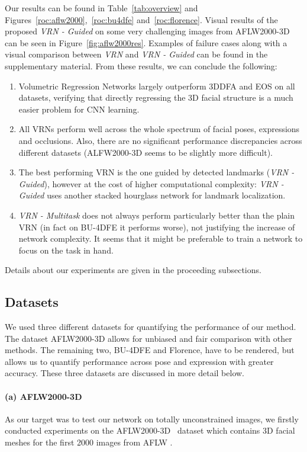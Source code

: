 Our results can be found in Table~\ref{tab:overview} and
Figures~\ref{roc:aflw2000},~\ref{roc:bu4dfe} and~\ref{roc:florence}.
Visual results of the proposed \textit{VRN - Guided} on some very
challenging images from AFLW2000-3D can be seen in
Figure~\ref{fig:aflw2000res}. Examples of failure cases along with a
visual comparison between \textit{VRN} and \textit{VRN - Guided} can
be found in the supplementary material. From these results, we can
conclude the following:
\begin{enumerate}
\item Volumetric Regression Networks largely outperform 3DDFA and EOS
  on all datasets, verifying that directly regressing the 3D facial
  structure is a much easier problem for CNN learning.
\item All VRNs perform well across the whole spectrum of facial poses,
  expressions and occlusions. Also, there are no significant performance
  discrepancies across different datasets (ALFW2000-3D seems to be
  slightly more difficult).
\item The best performing VRN is the one guided by detected landmarks
  (\textit{VRN - Guided}), however at the cost of higher computational
  complexity: \textit{VRN - Guided} uses another stacked hourglass
  network for landmark localization.
\item \textit{VRN - Multitask} does not always perform particularly
  better than the plain VRN (in fact on BU-4DFE it performs worse), not
  justifying the increase of network complexity. It seems that it might
  be preferable to train a network to focus on the task in hand.
\end{enumerate}

\noindent Details about our experiments are given in the proceeding subsections.

\subsection{Datasets}

We used three different datasets for quantifying the performance of
our method. The dataset AFLW2000-3D allows for unbiased and fair
comparison with other methods. The remaining two, BU-4DFE and
Florence, have to be rendered, but allows us to quantify performance
across pose and expression with greater accuracy. These three datasets
are discussed in more detail below.

\paragraph{(a) AFLW2000-3D} As our target was to test
our network on totally unconstrained images, we firstly conducted
experiments on the AFLW2000-3D~\cite{zhu2016face} dataset which
contains 3D facial meshes for the first 2000 images from AFLW
\cite{aflw2011}.

